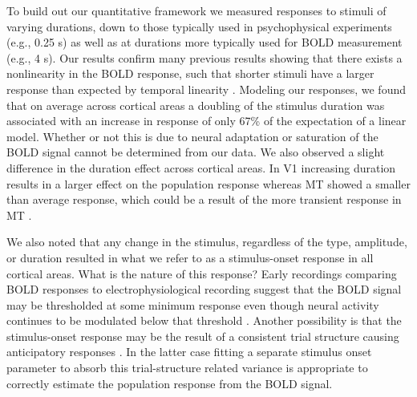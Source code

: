 \documentclass{report}
\begin{document}
To build out our quantitative framework we measured responses to stimuli of varying durations, down to those typically used in psychophysical experiments (e.g., 0.25 s) as well as at durations more typically used for BOLD measurement (e.g., 4 s). Our results confirm many previous results showing that there exists a nonlinearity in the BOLD response, such that shorter stimuli have a larger response than expected by temporal linearity \citep{Boynton1996-ff,Boynton2012-xy}. Modeling our responses, we found that on average across cortical areas a doubling of the stimulus duration was associated with an increase in response of only 67\% of the expectation of a linear model. Whether or not this is due to neural adaptation \citep{Buxton2004-rg} or saturation of the BOLD signal \citep{Friston1998-bo} cannot be determined from our data. We also observed a slight difference in the duration effect across cortical areas. In V1 increasing duration results in a larger effect on the population response whereas MT showed a smaller than average response, which could be a result of the more transient response in MT \citep{Stigliani2017-oe}.

We also noted that any change in the stimulus, regardless of the type, amplitude, or duration resulted in what we refer to as a stimulus-onset response in all cortical areas. What is the nature of this response? Early recordings comparing BOLD responses to electrophysiological recording suggest that the BOLD signal may be thresholded at some minimum response even though neural activity continues to be modulated below that threshold \citep{Logothetis2001-kk}. Another possibility is that the stimulus-onset response may be the result of a consistent trial structure causing anticipatory responses \citep{Cardoso2012-cu}. In the latter case fitting a separate stimulus onset parameter to absorb this trial-structure related variance is appropriate to correctly estimate the population response from the BOLD signal.
\end{document}

